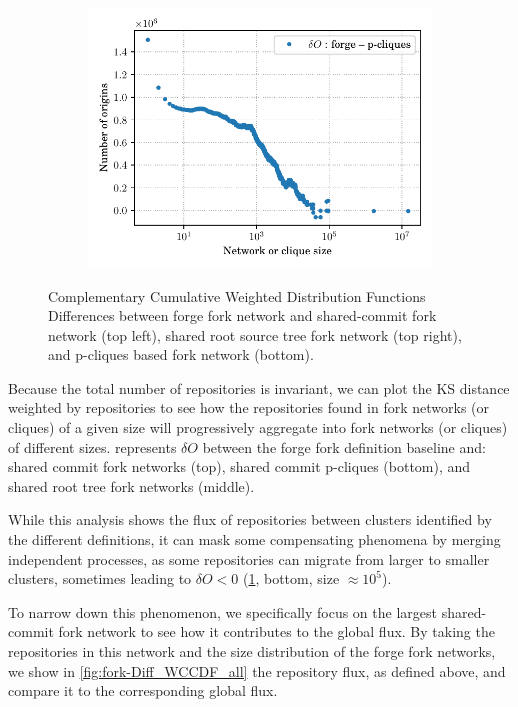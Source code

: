 \begin{figure}
\begin{subfigure}{.45\textwidth}
    \includegraphics[width=\linewidth]{img/forks/wccdf-forges-pcliques.pdf}
    \end{subfigure}
    \caption{Complementary Cumulative Weighted Distribution Functions
    Differences between forge fork network and shared-commit fork network
    (top left), shared root source tree fork network (top right), and p-cliques
    based fork network (bottom).}%
    \label{fig:fork-flux-gh-rev_rootdir_pcliques}
\end{figure}

Because the total number of repositories is invariant, we can plot the KS
distance weighted by repositories to see how the repositories found in fork
networks (or cliques) of a given size will progressively aggregate into fork
networks (or cliques) of different sizes.
 represents $\delta O$ between
the forge fork definition baseline and: shared commit fork networks (top),
shared commit p-cliques (bottom), and shared root tree fork networks (middle).

While this analysis shows the flux of repositories between clusters identified
by the different definitions, it can mask some compensating phenomena by
merging independent processes, as some repositories can migrate from larger to
smaller clusters,
sometimes leading to $\delta O<0$
(\cref{fig:fork-flux-gh-rev_rootdir_pcliques}, bottom, size $\approx 10^5$).

To narrow down this phenomenon, we specifically focus on the
largest shared-commit fork network to see how it contributes to the global
flux. By taking the repositories in this network and the size
distribution of the forge fork networks, we show in \cref{fig:fork-Diff_WCCDF_all}
the repository flux, as defined above, and compare it to the corresponding
global flux.

